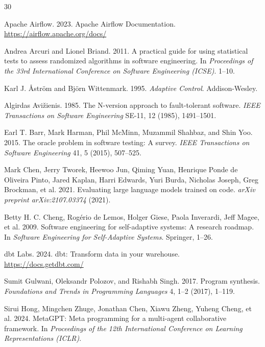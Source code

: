 \documentclass[sigconf,nonacm]{acmart}
\begin{document}

\begin{thebibliography}{30}

Apache Airflow. 2023.
Apache Airflow Documentation.
\url{https://airflow.apache.org/docs/}

Andrea Arcuri and Lionel Briand. 2011.
A practical guide for using statistical tests to assess randomized algorithms in software engineering.
In \textit{Proceedings of the 33rd International Conference on Software Engineering (ICSE)}. 1--10.

Karl J. \AA{}str\"om and Bj\"orn Wittenmark. 1995.
\textit{Adaptive Control}.
Addison-Wesley.

Algirdas Avi\v{z}ienis. 1985.
The N-version approach to fault-tolerant software.
\textit{IEEE Transactions on Software Engineering} SE-11, 12 (1985), 1491--1501.

Earl T. Barr, Mark Harman, Phil McMinn, Muzammil Shahbaz, and Shin Yoo. 2015.
The oracle problem in software testing: A survey.
\textit{IEEE Transactions on Software Engineering} 41, 5 (2015), 507--525.

Mark Chen, Jerry Tworek, Heewoo Jun, Qiming Yuan, Henrique Ponde de Oliveira Pinto, Jared Kaplan, Harri Edwards, Yuri Burda, Nicholas Joseph, Greg Brockman, et al. 2021.
Evaluating large language models trained on code.
\textit{arXiv preprint arXiv:2107.03374} (2021).

Betty H. C. Cheng, Rog\'erio de Lemos, Holger Giese, Paola Inverardi, Jeff Magee, et al. 2009.
Software engineering for self-adaptive systems: A research roadmap.
In \textit{Software Engineering for Self-Adaptive Systems}. Springer, 1--26.

dbt Labs. 2024.
dbt: Transform data in your warehouse.
\url{https://docs.getdbt.com/}

Sumit Gulwani, Oleksandr Polozov, and Rishabh Singh. 2017.
Program synthesis.
\textit{Foundations and Trends in Programming Languages} 4, 1--2 (2017), 1--119.

Sirui Hong, Mingchen Zhuge, Jonathan Chen, Xiawu Zheng, Yuheng Cheng, et al. 2024.
MetaGPT: Meta programming for a multi-agent collaborative framework.
In \textit{Proceedings of the 12th International Conference on Learning Representations (ICLR)}.


\end{thebibliography}
\end{document}
